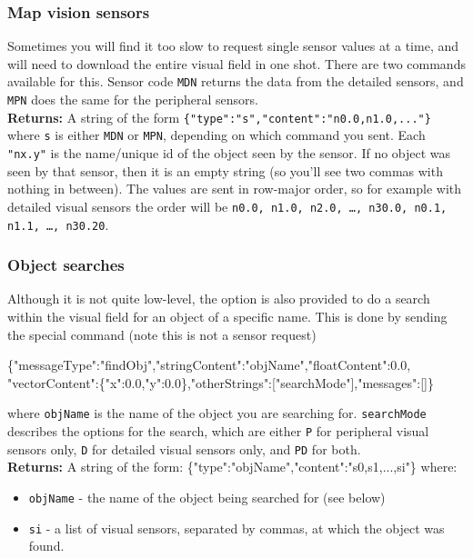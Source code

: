 \subsubsection{Map vision sensors}

Sometimes you will find it too slow to request single sensor values at a time, and will need to download the entire visual field in one shot. There are two commands available for this. Sensor code \texttt{MDN} returns the data from the detailed sensors, and \texttt{MPN} does the same for the peripheral sensors. \\

\noindent \textbf{Returns:} A string of the form \texttt{\{"type":"s","content":"n0.0,n1.0,..."\}} where \texttt{s} is either \texttt{MDN} or \texttt{MPN}, depending on which command you sent. Each \texttt{"nx.y"} is the name/unique id of the object seen by the sensor. If no object was seen by that sensor, then it is an empty string (so you'll see two commas with nothing in between). The values are sent in row-major order, so for example with detailed visual sensors the order will be \texttt{n0.0, n1.0, n2.0, \ldots, n30.0, n0.1, n1.1, \ldots, n30.20}.

\subsubsection{Object searches}

Although it is not quite low-level, the option is also provided to do a search within the visual field for an object of a specific name. This is done by sending the special command (note this is not a sensor request)
\begin{center}
	\scriptsize{\{"messageType":"findObj","stringContent":"objName","floatContent":0.0, "vectorContent":\{"x":0.0,"y":0.0\},"otherStrings":["searchMode"],"messages":[]\}}
\end{center}
 where \texttt{objName} is the name of the object you are searching for. \texttt{searchMode} describes the options for the search, which are either \texttt{P} for peripheral visual sensors only, \texttt{D} for detailed visual sensors only, and \texttt{PD} for both.\\

\noindent \textbf{Returns:} A string of the form: \scriptsize{\{"type":"objName","content":"s0,s1,...,si"\}} where:

\begin{itemize}
\item \texttt{objName} - the name of the object being searched for (see below)
\item \texttt{si} - a list of visual sensors, separated by commas, at which the object was found. 
\end{itemize}

